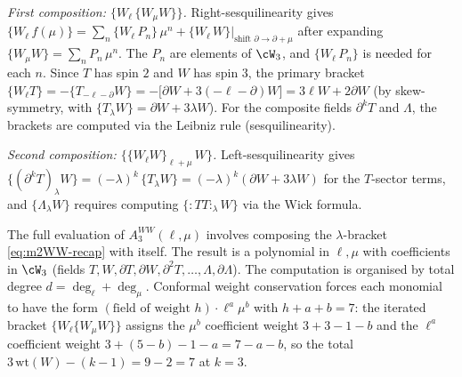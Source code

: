 \smallskip
\emph{First composition: $\{W_\ell\,\{W_\mu W\}\}$.}
Right-sesquilinearity gives
$\{W_\ell\, f(\mu)\} = \sum_n \{W_\ell\, P_n\}\,\mu^n
 + \{W_\ell\, W\}\bigl|_{\text{shift }\partial\to\partial+\mu}$
after expanding $\{W_\mu W\} = \sum_n P_n\,\mu^n$.
The $P_n$ are elements of $\cW_3$, and $\{W_\ell\, P_n\}$ is needed for each $n$. Since $T$ has spin $2$ and
$W$ has spin $3$, the primary bracket
$\{W_\ell T\} = -\{T_{-\ell-\partial} W\}
 = -\bigl[\partial W + 3(-\ell-\partial)W\bigr]
 = 3\ell W + 2\partial W$
(by skew-symmetry, with $\{T_\lambda W\} = \partial W + 3\lambda W$).
For the composite fields $\partial^k T$ and $\Lambda$, the brackets
are computed via the Leibniz rule (sesquilinearity).

\smallskip
\emph{Second composition:
$\{\{W_\ell W\}_{\ell+\mu}\, W\}$.}
Left-sesquilinearity gives
$\{(\partial^k T)_\lambda W\} = (-\lambda)^k\,\{T_\lambda W\}
= (-\lambda)^k(\partial W + 3\lambda W)$ for the $T$-sector terms,
and $\{\Lambda_\lambda W\}$ requires computing
$\{{:}TT{:}_\lambda W\}$ via the Wick formula.

\smallskip
The full evaluation of $A_3^{WW}(\ell,\mu)$ involves composing the
$\lambda$-bracket \eqref{eq:m2WW-recap} with itself.
The result is a polynomial in $\ell,\mu$ with coefficients in
$\cW_3$ (fields $T, W, \partial T, \partial W,
\partial^2 T, \ldots, \Lambda, \partial\Lambda$).
The computation is organised by total degree
$d = \deg_\ell + \deg_\mu$. Conformal weight conservation
forces each monomial to have the form
$(\text{field of weight } h) \cdot \ell^a \mu^b$ with
$h + a + b = 7$: the iterated bracket
$\{W_\ell\{W_\mu W\}\}$ assigns the $\mu^b$ coefficient weight
$3+3-1-b$ and the $\ell^a$ coefficient weight
$3 + (5-b) - 1 - a = 7 - a - b$, so the total
$3\,\mathrm{wt}(W) - (k-1) = 9 - 2 = 7$ at $k = 3$.

